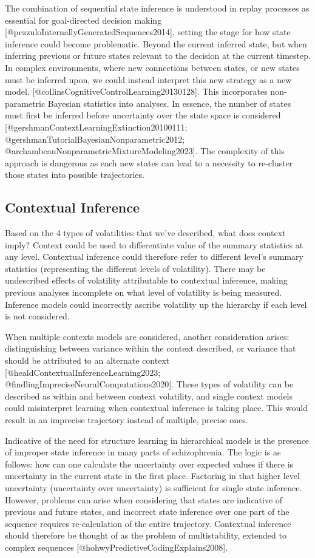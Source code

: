 \documentclass{article}
\begin{document}
The combination of sequential state inference is understood in replay processes as essential for goal-directed decision making [@pezzuloInternallyGeneratedSequences2014], setting the stage for how state inference could become problematic. Beyond the current inferred state, but when inferring previous or future states relevant to the decision at the current timestep. In complex environments, where new connections between states, or new states must be inferred upon, we could instead interpret this new strategy as a new model. [@collinsCognitiveControlLearning20130128]. This incorporates non-parametric Bayesian statistics into analyses. In essence, the number of states must first be inferred before uncertainty over the state space is considered [@gershmanContextLearningExtinction20100111; @gershmanTutorialBayesianNonparametric2012; @archambeauNonparametricMixtureModeling2023]. The complexity of this approach is dangerous as each new states can lead to a necessity to re-cluster those states into possible trajectories.

\subsection{Contextual Inference}

Based on the 4 types of volatilities that we've described, what does context imply? Context could be used to differentiate value of the summary statistics at any level. Contextual inference could therefore refer to different level's summary statistics (representing the different levels of volatility). There may be undescribed effects of volatility attributable to contextual inference, making previous analyses incomplete on what level of volatility is being measured. Inference models could incorrectly ascribe volatility up the hierarchy if each level is not considered.

When multiple contexts models are considered, another consideration arises: distinguishing between variance within the context described, or variance that should be attributed to an alternate context [@healdContextualInferenceLearning2023; @findlingImpreciseNeuralComputations2020]. These types of volatility can be described as within and between context volatility, and single context models could misinterpret learning when contextual inference is taking place. This would result in an imprecise trajectory instead of multiple, precise ones.

Indicative of the need for structure learning in hierarchical models is the presence of improper state inference in many parts of schizophrenia. The logic is as follows: how can one calculate the uncertainty over expected values if there is uncertainty in the current state in the first place. Factoring in that higher level uncertainty (uncertainty over uncertainty) is sufficient for single state inference. However, problems can arise when considering that states are indicative of previous and future states, and incorrect state inference over one part of the sequence requires re-calculation of the entire trajectory. Contextual inference should therefore be thought of as the problem of multistability, extended to complex sequences [@hohwyPredictiveCodingExplains2008].
\end{document}
